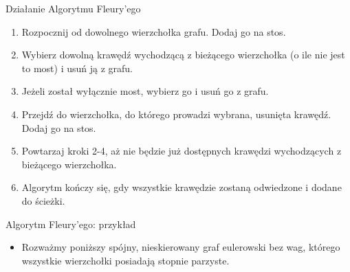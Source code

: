 \documentclass[polish,envcountsect,10pt]{beamer}
\begin{document}
\begin{frame}{Działanie Algorytmu Fleury'ego}
    \begin{enumerate}
        \item Rozpocznij od dowolnego wierzchołka grafu. Dodaj go na stos.
        \item Wybierz dowolną krawędź wychodzącą z bieżącego wierzchołka (o ile nie jest to most)  i usuń ją z grafu.
        \item Jeżeli został wyłącznie most, wybierz go i usuń go z grafu.
        \item Przejdź do wierzchołka, do którego prowadzi wybrana, usunięta krawędź. Dodaj go na stos.
        \item Powtarzaj kroki 2-4, aż nie będzie już dostępnych krawędzi wychodzących z bieżącego wierzchołka.
        \item Algorytm kończy się, gdy wszystkie krawędzie zostaną odwiedzone i dodane do ścieżki.
    \end{enumerate}
\end{frame}

\begin{frame}{Algorytm Fleury'ego: przykład}
    \begin{itemize}
          \item Rozważmy poniższy spójny, nieskierowany graf eulerowski bez wag, którego wszystkie wierzchołki posiadają stopnie parzyste.
    \end{itemize}
    \begin{center}
    \end{center}
\end{frame}
    
\end{document}
